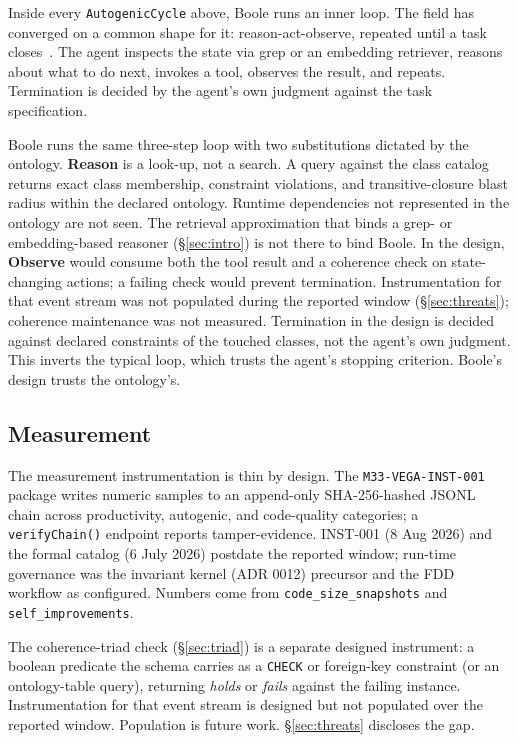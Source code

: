 \documentclass[conference,10pt]{IEEEtran}
\begin{document}
Inside every \texttt{AutogenicCycle} above, Boole runs an inner loop. The field
has converged on a common shape for it: reason-act-observe, repeated
until a task closes~\cite{react2023,sweagent2024,openhands2025}. The
agent inspects the state via grep or an embedding retriever,
reasons about what to do next, invokes a tool, observes the result, and
repeats. Termination is decided by the agent's own judgment against the
task specification.

Boole runs the same three-step loop with two substitutions dictated by
the ontology. \textbf{Reason} is a look-up, not a search. A query against the
class catalog returns exact class membership, constraint violations,
and transitive-closure blast radius within the declared ontology.
Runtime dependencies not represented in the ontology are not seen. The retrieval
approximation that binds a grep- or embedding-based reasoner
(§\ref{sec:intro}) is not there to bind Boole. In the design, \textbf{Observe} would consume both the tool result and a
coherence check on state-changing actions; a failing check would
prevent termination. Instrumentation for that event stream was not
populated during the reported window (§\ref{sec:threats});
coherence maintenance was not measured. Termination in the design is
decided against declared constraints of the touched classes, not the
agent's own judgment. This inverts the typical loop, which trusts the
agent's stopping criterion. Boole's design trusts the ontology's.

\subsection{Measurement}\label{sec:measurement}

The measurement instrumentation is thin by design. The
\texttt{M33-VEGA-INST-001} package writes numeric samples to an append-only
SHA-256-hashed JSONL chain across productivity, autogenic, and
code-quality categories; a \texttt{verifyChain()} endpoint reports
tamper-evidence. INST-001 (8 Aug 2026) and the formal catalog (6 July
2026) postdate the reported window; run-time governance was the
invariant kernel (ADR 0012) precursor and the FDD workflow as
configured. Numbers come from \texttt{code\_size\_snapshots} and
\texttt{self\_improvements}.

The coherence-triad check (§\ref{sec:triad}) is a separate
designed instrument: a boolean predicate the schema carries as a
\texttt{CHECK} or foreign-key constraint (or an ontology-table query),
returning \emph{holds} or \emph{fails} against the failing instance.
Instrumentation for that event stream is designed but not populated over the reported
window. Population is future work. §\ref{sec:threats}
discloses the gap.
\end{document}
